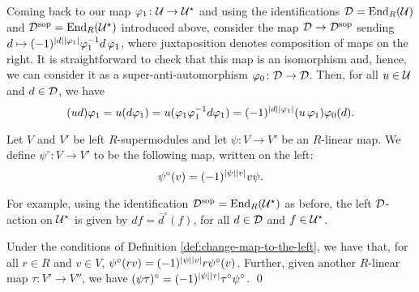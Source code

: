 

Coming back to our map $\varphi_1\colon \mathcal U \to \mathcal U^\star$ and using the identifications $\mathcal{D} = \operatorname{End}_R(\mathcal U)$ and $\mathcal{D}^{\mathrm{sop}} = \operatorname{End}_R(\mathcal U^\star)$ introduced above, consider the map $\mathcal{D} \to \mathcal{D}^{\mathrm{sop}}$ sending $d \mapsto (-1)^{|d||\varphi_1|}\varphi_1^{-1} d \,\varphi_1$, where juxtaposition denotes composition of maps on the right. 
It is straightforward to check that this map is an isomorphism and, hence, we can consider it as a super-anti-automorphism $\varphi_0 \colon \mathcal{D} \to \mathcal{D}$. 
Then, for all $u\in \mathcal U$ and $d\in \mathcal{D}$, we have
%
\begin{equation}\label{eq:sesquilinear-before-B}
    (ud)\varphi_1 = u (d\varphi_1) =  u(\varphi_1\varphi_1^{-1} d \varphi_1) = (-1)^{|d||\varphi_1|}(u\,\varphi_1 )\varphi_0(d).
\end{equation}


\begin{defi}\label{def:change-map-to-the-left}
    Let $V$ and $V'$ be left $R$-supermodules and let $\psi: V \to V'$ be an $R$-linear map. We define $\psi^\circ: V \to  V'$ to be the following map, written on the left:
    \[
        \psi^\circ(v) = (-1)^{|\psi||v|} v\psi.
    \]
\end{defi}

For example, using the identification $\mathcal{D}^{\mathrm{sop}} = \operatorname{End}_R (\mathcal U^\star)$ as before, the left $\mathcal{D}$-action on $\mathcal U^\star$ is given by $df = \bar d^\circ (f)$, for all $d\in \mathcal{D}$ and $f\in \mathcal U^\star$.

\begin{lemma}\label{lemma:change-of-side-properties}
    Under the conditions of Definition \ref{def:change-map-to-the-left}, we have that, for all $r\in R$ and $v\in V$,  $\psi^\circ (rv) = (-1)^{|\psi||v|} r \psi^\circ (v)$. 
    Further, given another $R$-linear map $\tau: V' \to V''$, we have $(\psi\tau)^\circ = (-1)^{|\psi||\tau|} \tau^\circ\psi^\circ$. \qed
\end{lemma}

